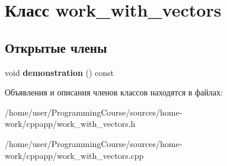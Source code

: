 \hypertarget{classwork__with__vectors}{\section{Класс work\+\_\+with\+\_\+vectors}
\label{classwork__with__vectors}
}
\subsection*{Открытые члены}
\begin{DoxyCompactItemize}
\item 
\hypertarget{classwork__with__vectors_afe23684b1caa72760df4a526b9171e77}{void {\bfseries demonstration} () const }\label{classwork__with__vectors_afe23684b1caa72760df4a526b9171e77}

\end{DoxyCompactItemize}


Объявления и описания членов классов находятся в файлах\+:\begin{DoxyCompactItemize}
\item 
/home/user/\+Programming\+Course/sources/home-\/work/cppapp/work\+\_\+with\+\_\+vectors.\+h\item 
/home/user/\+Programming\+Course/sources/home-\/work/cppapp/work\+\_\+with\+\_\+vectors.\+cpp\end{DoxyCompactItemize}
